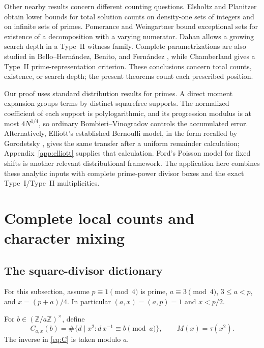 \documentclass[11pt]{article}
\theoremstyle{remark}\newtheorem{remark}[theorem]{Remark}
\begin{document}
Other nearby results concern different counting questions.
Elsholtz and Planitzer \cite{EP} obtain lower bounds for total solution
counts on density-one sets of integers and on infinite sets of primes.
Pomerance and Weingartner \cite{PW} bound exceptional sets for
existence of a decomposition with a varying numerator. Dahan
\cite[Section~4.3]{Dahan} allows a growing search depth in a Type~II
witness family. Complete parametrizations are also studied in
Bello--Hern\'andez, Benito, and Fern\'andez \cite{Bello}, while
Chamberland \cite{Chamberland} gives a Type~II prime-representation
criterion. These conclusions concern total counts, existence, or
search depth; the present theorems count each prescribed position.

Our proof uses standard distribution results for primes. A direct
moment expansion groups terms by distinct squarefree supports.
The normalized coefficient of each support is polylogarithmic,
and its progression modulus is at most $4N^{1/4}$, so ordinary
Bombieri--Vinogradov controls the accumulated error.
Alternatively, Elliott's established Bernoulli model, in the form
recalled by Gorodetsky \cite[Theorem~1.1]{Gorodetsky}, gives the same
transfer after a uniform remainder calculation;
Appendix~\ref{app:elliott} supplies that calculation. Ford's
Poisson model for fixed shifts \cite{Ford} is another relevant
distributional framework. The application here combines these
analytic inputs with complete prime-power divisor boxes and the
exact Type~I/Type~II multiplicities.

\section{Complete local counts and character mixing}\label{sec:dictionary}
\subsection{The square-divisor dictionary}
For this subsection, assume $p\equiv1\pmod4$ is prime,
$a\equiv3\pmod4$, $3\le a<p$, and $x=(p+a)/4$.
In particular $(a,x)=(a,p)=1$ and $x<p/2$.

For $b\in(\mathbb Z/a\mathbb Z)^\times$, define
\begin{equation}\label{eq:C}
 C_{a,x}(b)=\#\{d\mid x^2:d\,x^{-1}\equiv b\pmod a\},
 \qquad M(x)=\tau(x^2).
\end{equation}
The inverse in \eqref{eq:C} is taken modulo $a$.
\end{document}
